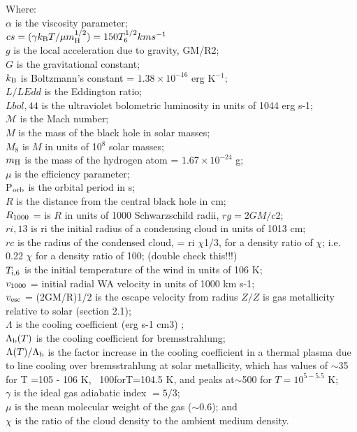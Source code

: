 \documentclass[11pt]{article}
\begin{document}
\noindent
Where:\\
$\alpha$ is the viscosity parameter; \\
$cs = (\gamma k_{\rm B} T/\mu m_{\rm H}^{1/2}) = 150 T_{6}^{1/2} km s^{-1}$ \\
$g$ is the local acceleration due to gravity, GM/R2; \\
$G$ is the gravitational constant; \\
$k_{\rm B}$ is Boltzmann’s constant = $1.38 \times10^{-16}$ erg K$^{-1}$;\\
$L/LEdd$ is the Eddington ratio; \\
$Lbol,44$ is the ultraviolet bolometric luminosity in units of 1044 erg s-1;\\
$\mathcal{M}$  is the Mach number; \\
$M$ is the mass of the black hole in solar masses;\\
$M_{8}$ is $M$ in units of 10$^{8}$ solar masses;\\
$m_{\rm H}$ is the mass of the hydrogen atom = $1.67\times10^{-24}$ g;\\
$\mu$ is the efficiency parameter; \\
P$_{\rm orb}$ is the orbital period in s;\\
$R$ is the distance from the central black hole in cm;\\
$R_{\rm 1000}$ = is $R$ in units of 1000 Schwarzschild radii, $rg = 2GM/c2$; \\
$ri,13$ is ri the initial radius of a condensing cloud in units of 1013 cm;\\
$rc$ is the radius of the condensed cloud, = ri $\chi$1/3, for a density ratio of $\chi$; i.e. 0.22 $\chi$ for a density ratio of 100; (double check this!!!)\\
$T_{\rm i,6}$ is the initial temperature of the wind in units of 106 K; \\
$v_{\rm 1000}$ = initial radial WA velocity in units of 1000 km s-1; \\
$v_{\rm esc}$ = (2GM/R)1/2 is the escape velocity from radius  %
$Z/Z$ is gas metallicity relative to solar (section 2.1); \\
$\Lambda$ is the cooling coefficient (erg s-1 cm3) ; \\
$\Lambda_{\rm b} (T)$ is the cooling coefficient for bremsstrahlung; \\
$\Lambda (T) /\Lambda_{\rm b}$  is the factor increase in the cooling
coefficient in a thermal plasma due to line cooling over
bremsstrahlung at solar metallicity, which has values of $\sim$35 for 
T =105 - 106 K, ~100forT=104.5 K, and peaks at$\sim$500 for $T=10^{5-5.5}$ K;\\
$\gamma$ is the ideal gas adiabatic index $= 5/3$; \\
$\mu$ is the mean molecular weight of the gas ($\sim$0.6); and\\
$\chi$ is the ratio of the cloud density to the ambient medium density.






\end{document}
